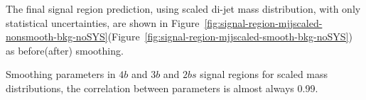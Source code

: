 The final signal region prediction, using scaled di-jet mass distribution, with only statistical uncertainties, are shown in Figure~\ref{fig:signal-region-mjjscaled-nonsmooth-bkg-noSYS}(Figure~\ref{fig:signal-region-mjjscaled-smooth-bkg-noSYS}) as before(after) smoothing.

\begin{table}[htbp!]
\begin{center}

\caption{Smoothing parameters in $4b$ and $3b$ and $2bs$ signal regions for scaled mass distributions, the correlation between parameters is almost always 0.99.}
\label{tab:smoothparams_pole}
\end{center}
\end{table}


